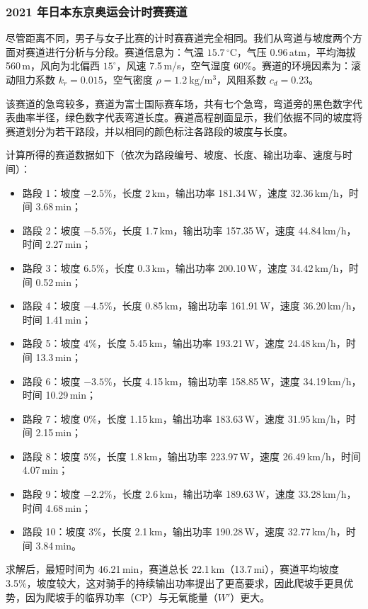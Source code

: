 \documentclass[11pt,a4paper]{ctexart}
\begin{document}
\subsubsection{2021 年日本东京奥运会计时赛赛道}

尽管距离不同，男子与女子比赛的计时赛赛道完全相同。我们从弯道与坡度两个方面对赛道进行分析与分段。赛道信息为：气温 $15.7\,^{\circ}\mathrm{C}$，气压 0.96\,atm，平均海拔 560\,m，风向为北偏西 $15^{\circ}$，风速 7.5\,m/s，空气湿度 60\%。赛道的环境因素为：滚动阻力系数 $k_r=0.015$，空气密度 $\rho=1.2\ \mathrm{kg/m^{3}}$，风阻系数 $c_d=0.23$。

该赛道的急弯较多，赛道为富士国际赛车场，共有七个急弯，弯道旁的黑色数字代表曲率半径，绿色数字代表弯道长度。赛道高程剖面显示，我们依据不同的坡度将赛道划分为若干路段，并以相同的颜色标注各路段的坡度与长度。

计算所得的赛道数据如下（依次为路段编号、坡度、长度、输出功率、速度与时间）：

\begin{itemize}
\item 路段 1：坡度 $-2.5\%$，长度 2\,km，输出功率 181.34\,W，速度 32.36\,km/h，时间 3.68\,min；
\item 路段 2：坡度 $-5.5\%$，长度 1.7\,km，输出功率 157.35\,W，速度 44.84\,km/h，时间 2.27\,min；
\item 路段 3：坡度 $6.5\%$，长度 0.3\,km，输出功率 200.10\,W，速度 34.42\,km/h，时间 0.52\,min；
\item 路段 4：坡度 $-4.5\%$，长度 0.85\,km，输出功率 161.91\,W，速度 36.20\,km/h，时间 1.41\,min；
\item 路段 5：坡度 $4\%$，长度 5.45\,km，输出功率 193.21\,W，速度 24.48\,km/h，时间 13.3\,min；
\item 路段 6：坡度 $-3.5\%$，长度 4.15\,km，输出功率 158.85\,W，速度 34.19\,km/h，时间 10.29\,min；
\item 路段 7：坡度 $0\%$，长度 1.15\,km，输出功率 183.63\,W，速度 31.95\,km/h，时间 2.15\,min；
\item 路段 8：坡度 $5\%$，长度 1.8\,km，输出功率 223.97\,W，速度 26.49\,km/h，时间 4.07\,min；
\item 路段 9：坡度 $-2.2\%$，长度 2.6\,km，输出功率 189.63\,W，速度 33.28\,km/h，时间 4.68\,min；
\item 路段 10：坡度 $3\%$，长度 2.1\,km，输出功率 190.28\,W，速度 32.77\,km/h，时间 3.84\,min。
\end{itemize}

求解后，最短时间为 46.21\,min，赛道总长 22.1\,km（13.7\,mi），赛道平均坡度 3.5\%，坡度较大，这对骑手的持续输出功率提出了更高要求，因此爬坡手更具优势，因为爬坡手的临界功率（CP）与无氧能量（$W'$）更大。
\end{document}
